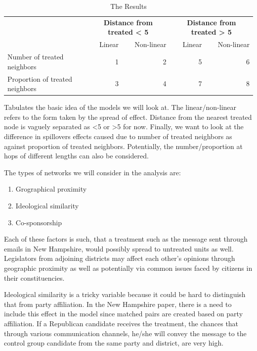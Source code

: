 \documentclass[12pt]{article}
\begin{document}
\begin{table}
        \begin{tabular}{lrrrr}\toprule
            &\multicolumn{2}{c}{\textbf{Distance from treated < 5}}&\multicolumn{2}{c}{\textbf{Distance from treated > 5}}
            \\\cmidrule(r){2-3}\cmidrule(r){4-5}
            &Linear&Non-linear&Linear&Non-linear\\\midrule
            Number of treated neighbors    & 1 & 2
                    & 5 & 6\\
            Proportion of treated neighbors   & 3 & 4
                    & 7 & 8
            \\\bottomrule
        \end{tabular}
        \caption{The Results}\label{Tab2}
\end{table} 

Tabulates the basic idea of the models we will look at. The linear/non-linear refers to the form taken by the spread of effect. Distance from the nearest treated node is vaguely separated as <5 or >5 for now. Finally, we want to look at the difference in spillovers effects caused due to number of treated neighbors as against proportion of treated neighbors. Potentially, the number/proportion at hops of different lengths can also be considered.

The types of networks we will consider in the analysis are: \\

\begin{enumerate}

\item Grographical proximity
\item Ideological similarity
\item Co-sponsorship

\end{enumerate}

Each of these factors is such, that a treatment such as the message sent through emails in New Hampshire, would possibly spread to untreated units as well. Legislators from adjoining districts may affect each other's opinions through geographic proximity as well as potentially via common issues faced by citizens in their constituencies.

Ideological similarity is a tricky variable because it could be hard to distinguish that from party affiliation. In the New Hampshire paper, there is a need to include this effect in the model since matched pairs are created based on party affiliation. If a Republican candidate receives the treatment, the chances that through various communication channels, he/she will convey the message to the control group candidate from the same party and district, are very high.
\end{document}
